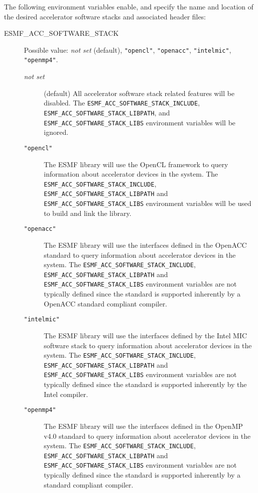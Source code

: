 The following environment variables enable, and specify the name and location
of the desired accelerator software stacks and associated header files:

\begin{description}

\item[ESMF\_ACC\_SOFTWARE\_STACK] Possible value: 
{\it not set} (default), {\tt "opencl"}, {\tt "openacc"},
{\tt "intelmic"}, {\tt "openmp4"}.

\begin{description}
\item[{\it not set}] (default) All accelerator software stack related features
 will be disabled.
The {\tt ESMF\_ACC\_SOFTWARE\_STACK\_INCLUDE}, 
{\tt ESMF\_ACC\_SOFTWARE\_STACK\_LIBPATH}, and
{\tt ESMF\_ACC\_SOFTWARE\_STACK\_LIBS} environment variables will be ignored.

\item[{\tt "opencl"}] The ESMF library will use the OpenCL
framework to query information about accelerator devices in the system.
The {\tt ESMF\_ACC\_SOFTWARE\_STACK\_INCLUDE},
{\tt ESMF\_ACC\_SOFTWARE\_STACK\_LIBPATH} and
{\tt ESMF\_ACC\_SOFTWARE\_STACK\_LIBS} environment variables will be used
to build and link the library.

\item[{\tt "openacc"}] The ESMF library will use the interfaces defined
in the OpenACC standard to query information about accelerator devices 
in the system.
The {\tt ESMF\_ACC\_SOFTWARE\_STACK\_INCLUDE},
{\tt ESMF\_ACC\_SOFTWARE\_STACK\_LIBPATH} and
{\tt ESMF\_ACC\_SOFTWARE\_STACK\_LIBS} environment variables are not typically
defined since the standard is supported inherently by a OpenACC standard
compliant compiler.

\item[{\tt "intelmic"}] The ESMF library will use the interfaces defined
by the Intel MIC software stack to query information about accelerator devices 
in the system.
The {\tt ESMF\_ACC\_SOFTWARE\_STACK\_INCLUDE},
{\tt ESMF\_ACC\_SOFTWARE\_STACK\_LIBPATH} and
{\tt ESMF\_ACC\_SOFTWARE\_STACK\_LIBS} environment variables are not typically
defined since the standard is supported inherently by the Intel compiler.

\item[{\tt "openmp4"}] The ESMF library will use the interfaces defined
in the OpenMP v4.0 standard to query information about accelerator devices 
in the system.
The {\tt ESMF\_ACC\_SOFTWARE\_STACK\_INCLUDE},
{\tt ESMF\_ACC\_SOFTWARE\_STACK\_LIBPATH} and
{\tt ESMF\_ACC\_SOFTWARE\_STACK\_LIBS} environment variables are not typically
defined since the standard is supported inherently by a standard compliant
compiler.


\end{description}
\end{description}
